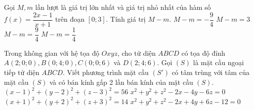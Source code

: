 	\begin{ex}%
	Gọi $M,m$ lần lượt là giá trị lớn nhất và giá trị nhỏ nhất của hàm số $f(x)=\dfrac{2x-1}{x+1}$ trên đoạn $[0;3]$. Tính giá trị $M-m$.
	\choice
	{$M-m=-\dfrac{9}{4}$}
	{$M-m=3$}
	{\True $M-m=\dfrac{9}{4}$}
	{$M-m=\dfrac{1}{4}$}
	\end{ex}
	\begin{ex}%
	Trong không gian với hệ tọa độ $Oxyz$, cho tứ diện $ABCD$ có tọa độ đỉnh $A(2;0;0),B(0;4;0),C(0;0;6)$ và $D(2;4;6)$. Gọi $(S)$ là mặt cầu ngoại tiếp tứ diện $ABCD$. Viết phương trình mặt cầu $(S')$ có tâm trùng với tâm của mặt cầu $(S)$ và có bán kính gấp 2 lần bán kính của mặt cầu $(S)$.
	\choice
	{\True $(x-1)^2+(y-2)^2+(z-3)^2=56$}
	{$x^2+y^2+z^2-2x-4y-6z=0$}
	{$(x+1)^2+(y+2)^2+(z+3)^2=14$}
	{$x^2+y^2+z^2-2x+4y+6z-12=0$}
	\end{ex}

